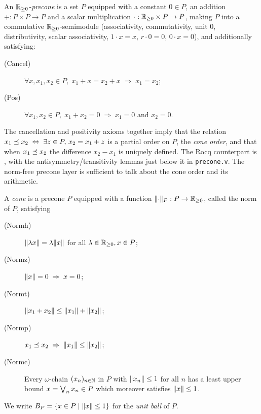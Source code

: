 \begin{definition}[Precone]\label{def:precone}
\rocqok{}
An $\mathbb{R}_{\geq 0}$-\emph{precone} is a set $P$ equipped with a constant
$0 \in P$, an addition $+ : P \times P \to P$ and a scalar
multiplication ${\cdot}: \mathbb{R}_{\geq 0} \times P \to P$, making $P$ into a
commutative $\mathbb{R}_{\geq 0}$-semimodule (associativity, commutativity, unit
$0$, distributivity, scalar associativity, $1 \cdot x = x$,
$r \cdot 0 = 0$, $0 \cdot x = 0$), and additionally satisfying:
\begin{description}
  \item[\textnormal{(Cancel)}] $\forall x, x_1, x_2 \in P,\;
    x_1 + x = x_2 + x \;\Rightarrow\; x_1 = x_2$;
  \item[\textnormal{(Pos)}] $\forall x_1, x_2 \in P,\;
    x_1 + x_2 = 0 \;\Rightarrow\; x_1 = 0 \text{ and } x_2 = 0$.
\end{description}
\end{definition}

The cancellation and positivity axioms together imply that the
relation $x_1 \preceq x_2 \;\Leftrightarrow\; \exists z\in P,\,
x_2 = x_1 + z$ is a partial order on $P$, the \emph{cone order},
and that when $x_1 \preceq x_2$ the difference $x_2 - x_1$ is uniquely
defined. The Rocq counterpart is ,
with the antisymmetry/transitivity lemmas just below it in
\texttt{precone.v}. The norm-free precone layer is sufficient to talk
about the cone order and its arithmetic.

\begin{definition}[Cone]\label{def:cone}
\rocqok{}
A \emph{cone} is a precone $P$ equipped with a function
$\lVert \cdot \rVert_P : P \to \mathbb{R}_{\geq 0}$, called the norm of $P$, satisfying
\begin{description}
  \item[\textnormal{(Normh)}]
    $\lVert \lambda x \rVert = \lambda \lVert x \rVert$ for all
    $\lambda \in \mathbb{R}_{\geq 0}, x \in P$;
  \item[\textnormal{(Normz)}]
    $\lVert x \rVert = 0 \;\Rightarrow\; x = 0$;
  \item[\textnormal{(Normt)}]
    $\lVert x_1 + x_2 \rVert \leq \lVert x_1 \rVert + \lVert x_2 \rVert$;
  \item[\textnormal{(Normp)}]
    $x_1 \preceq x_2 \;\Rightarrow\; \lVert x_1 \rVert \leq \lVert x_2 \rVert$;
  \item[\textnormal{(Normc)}]
    Every $\omega$-chain $(x_n)_{n \in \mathbb{N}}$ in $P$ with
    $\lVert x_n \rVert \leq 1$ for all $n$ has a least upper bound
    $x = \bigvee_{n} x_n \in P$ which moreover satisfies
    $\lVert x \rVert \leq 1$.
\end{description}
We write $B_P = \{x \in P \mid \lVert x \rVert \leq 1\}$ for the
\emph{unit ball} of $P$.
\end{definition}

